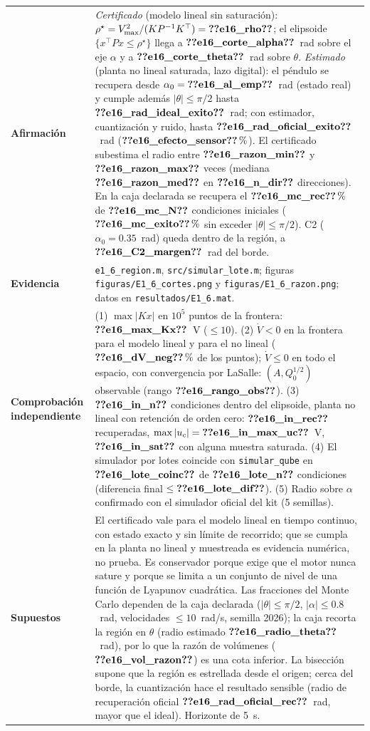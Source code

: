 \begin{recuadro}[title=Ficha de evidencia — E1.6: región de atracción del regulador saturado]
\begin{tabularx}{\linewidth}{@{}>{\bfseries}p{3.1cm} >{\raggedright\arraybackslash}X@{}}
Afirmación &
\emph{Certificado} (modelo lineal sin saturación): $\rho^\star=V_{\max}^2/(KP^{-1}K^\top)=\V{e16_rho}$; el
elipsoide $\{x^\top Px\le\rho^\star\}$ llega a $\V{e16_corte_alpha}$~rad sobre el eje $\alpha$ y a $\V{e16_corte_theta}$~rad
sobre $\theta$. \emph{Estimado} (planta no lineal saturada, lazo digital): el péndulo se recupera desde
$\alpha_0=\V{e16_al_emp}$~rad (estado real) y cumple además $|\theta|\le\pi/2$ hasta $\V{e16_rad_ideal_exito}$~rad; con
estimador, cuantización y ruido, hasta $\V{e16_rad_oficial_exito}$~rad ($\V{e16_efecto_sensor}\,\%$). El certificado
subestima el radio entre $\V{e16_razon_min}$ y $\V{e16_razon_max}$ veces (mediana $\V{e16_razon_med}$ en $\V{e16_n_dir}$
direcciones). En la caja declarada se recupera el $\V{e16_mc_rec}\,\%$ de $\V{e16_mc_N}$ condiciones iniciales
($\V{e16_mc_exito}\,\%$ sin exceder $|\theta|\le\pi/2$). C2 ($\alpha_0=0.35$~rad) queda dentro de la región, a
$\V{e16_C2_margen}$~rad del borde. \\[3pt]
Evidencia &
\texttt{e1\_6\_region.m}, \texttt{src/simular\_lote.m}; figuras \texttt{figuras/E1\_6\_cortes.png} y
\texttt{figuras/E1\_6\_razon.png}; datos en \texttt{resultados/E1\_6.mat}. \\[3pt]
Comprobación independiente &
(1) $\max|Kx|$ en $10^5$ puntos de la frontera: $\V{e16_max_Kx}$~V ($\le10$).
(2) $\dot V<0$ en la frontera para el modelo lineal y para el no lineal ($\V{e16_dV_neg}\,\%$ de los puntos); $\dot V\le0$
en todo el espacio, con convergencia por LaSalle: $(A,Q_0^{1/2})$ observable (rango $\V{e16_rango_obs}$).
(3) $\V{e16_in_n}$ condiciones dentro del elipsoide, planta no lineal con retención de orden cero: $\V{e16_in_rec}$
recuperadas, $\max|u_c|=\V{e16_in_max_uc}$~V, $\V{e16_in_sat}$ con alguna muestra saturada.
(4) El simulador por lotes coincide con \texttt{simular\_qube} en $\V{e16_lote_coinc}$ de $\V{e16_lote_n}$ condiciones
(diferencia final $\le\V{e16_lote_dif}$).
(5) Radio sobre $\alpha$ confirmado con el simulador oficial del kit (5 semillas). \\[3pt]
Supuestos &
El certificado vale para el modelo lineal en tiempo continuo, con estado exacto y sin límite de
recorrido; que se cumpla en la planta no lineal y muestreada es evidencia numérica, no prueba. Es
conservador porque exige que el motor nunca sature y porque se limita a un conjunto de nivel de una
función de Lyapunov cuadrática. Las fracciones del Monte Carlo dependen de la caja declarada
($|\theta|\le\pi/2$, $|\alpha|\le0.8$~rad, velocidades $\le10$~rad/s, semilla 2026); la caja recorta la región en
$\theta$ (radio estimado $\V{e16_radio_theta}$~rad), por lo que la razón de volúmenes ($\V{e16_vol_razon}$) es una cota
inferior. La bisección supone que la región es estrellada desde el origen; cerca del borde, la cuantización hace
el resultado sensible (radio de recuperación oficial $\V{e16_rad_oficial_rec}$~rad, mayor que el ideal). Horizonte de 5~s.
\end{tabularx}
\end{recuadro}
